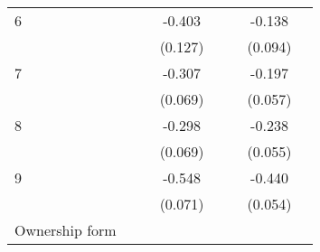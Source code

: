 {\begin{longtable}{l*{3}{c}|l*{3}{c}}
		6                   &                     &                     &      -0.403\sym{**} &                     &                     &      -0.138         \\
		&                     &                     &     (0.127)         &                     &                     &     (0.094)         \\
		7                   &                     &                     &      -0.307\sym{***}&                     &                     &      -0.197\sym{***}\\
		&                     &                     &     (0.069)         &                     &                     &     (0.057)         \\
		8                   &                     &                     &      -0.298\sym{***}&                     &                     &      -0.238\sym{***}\\
		&                     &                     &     (0.069)         &                     &                     &     (0.055)         \\
		9                   &                     &                     &      -0.548\sym{***}&                     &                     &      -0.440\sym{***}\\
		&                     &                     &     (0.071)         &                     &                     &     (0.054)         \\
		Ownership form &&&&&\\


\end{longtable}}
